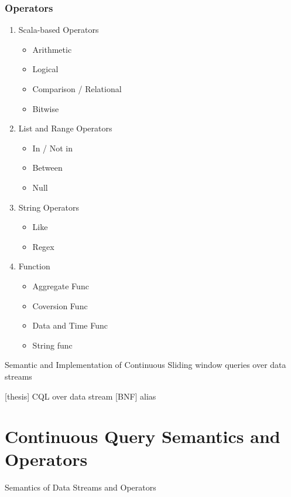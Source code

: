 \subsubsection{Operators}
\begin{enumerate}

\item Scala-based Operators
	\begin{itemize}
        \item Arithmetic
        \item Logical
        \item Comparison / Relational
        \item Bitwise
	\end{itemize}
	
 \item List and Range Operators
 	\begin{itemize}
        \item In / Not in
        \item Between
        \item Null
 	\end{itemize}
 \item String Operators
 	\begin{itemize}
        \item Like
        \item Regex
 	\end{itemize}
 \item Function 
 	\begin{itemize}
        \item Aggregate Func
        \item Coversion Func
       	\item Data and Time Func
        \item String func
 	\end{itemize}

\end{enumerate}
Semantic and Implementation of Continuous Sliding window queries over data streams

[thesis] CQL over data stream [BNF] alias



\section{Continuous Query Semantics and Operators} \label{semantic}
Semantics of Data Streams and Operators


